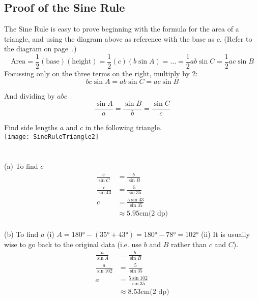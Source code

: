 \subsection*{Proof of the Sine Rule}
The Sine Rule is easy to prove beginning with the formula for the area of a triangle, and using the diagram above as reference with the base as $c$. (Refer to the diagram on page~\pageref{fig:triangleArea}.)
\begin{equation*}\text{Area} =\frac{1}{2}(\text{base})(\text{height})=\frac{1}{2} (c)(b\sin A)=\dots=\frac{1}{2}ab\sin C=\frac{1}{2}ac\sin B
\end{equation*}
Focussing only on the three terms on the right, multiply by 2:
\begin{equation*}b c \sin  A=ab\sin C=ac\sin B
\end{equation*}

And dividing by $a b c$
\begin{equation*}\frac{\sin A}{a}=\frac{\sin B}{b}=\frac{\sin C}{c}
\end{equation*}
\clearpage
\begin{multicols}{2}
\example Find side lengths $a$ and $c$ in the following triangle.\\
\texttt{[image: SineRuleTriangle2]}\\
$\phantom{1}$\\
$\phantom{1}$\\
\solution \medskip\\(a) To find $c$
\begin{align*}\frac{c}{\sin  C} &  = \frac{b}{\sin  B} \\
\frac{c}{\sin  43 } &  = \frac{5}{\sin  35 } \\
c &  = \frac{5 \sin  43 }{\sin  35 } \\
&  \approx   5.95 \mbox{cm}\text{(2 dp)}\end{align*} \\
(b) To find $a$ (i) $A =\ang{180}  -(\ang{35}  +\ang{43} ) =\ang{180}  -\ang{78}  =\ang{102}$ (ii) It is usually wise to go back to the original data (i.e. use $b$ and $B$ rather than $c$ and $C$).
\begin{align*}\frac{a}{\sin  A} &  = \frac{b}{\sin  B} \\
\frac{a}{\sin  102 } &  = \frac{5}{\sin  35 } \\
a &  = \frac{5 \sin  102 }{\sin  35 } \\
&  \approx   8.53 \mbox{cm}\text{(2 dp)}\end{align*}
\end{multicols}

